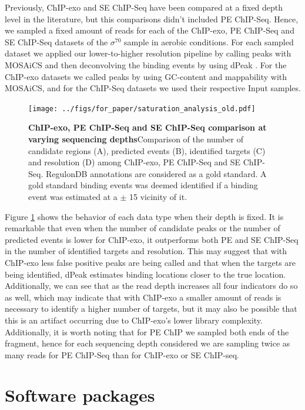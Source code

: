\documentclass[11pt]{article}\usepackage[]{graphicx}\usepackage[]{color}
\begin{document}
Previously, ChIP-exo and SE ChIP-Seq have been compared at a fixed
depth level in the literature, but this comparisons didn't included PE
ChIP-Seq. Hence, we sampled a fixed amount of reads for each of the
ChIP-exo, PE ChIP-Seq and SE ChIP-Seq datasets of the $\sigma^{70}$
sample in aerobic conditions. For each sampled dataset we applied our
lower-to-higher resolution pipeline by calling peaks with MOSAiCS
\cite{mosaics} and then deconvolving the binding events by using dPeak
\cite{dpeak}. For the ChIP-exo datasets we called peaks by using
GC-content and mappability with MOSAiCS, and for the ChIP-Seq datasets
we used their respective Input samples.

\begin{figure}[H]
  \centering
  \texttt{[image: ../figs/for\_paper/saturation\_analysis\_old.pdf]}
  \caption{\textbf{ChIP-exo, PE ChIP-Seq and SE ChIP-Seq comparison at
      varying sequencing depths}Comparison of the number of candidate
    regions (A), predicted events (B), identified targets (C) and
    resolution (D) among ChIP-exo, PE ChIP-Seq and SE
    ChIP-Seq. RegulonDB annotations are considered as a gold
    standard. A gold standard binding events was deemed identified if
    a binding event was estimated at a $\pm$ 15 vicinity of
    it.}
  \label{fig:design}
\end{figure}

Figure \ref{fig:design} shows the behavior of each data type when
their depth is fixed. It is remarkable that even when the number of
candidate peaks or the number of predicted events is lower for
ChIP-exo, it outperforms both PE and SE ChIP-Seq in the number of
identified targets and resolution. This may suggest that with ChIP-exo
less false positive peaks are being called and that when the targets
are being identified, dPeak estimates binding locations closer to the
true location. Additionally, we can see that as the read depth
increases all four indicators do so as well, which may indicate that
with ChIP-exo a smaller amount of reads is necessary to identify a
higher number of targets, but it may also be possible that this is an
artifact occurring due to ChIP-exo's lower library
complexity. Additionally, it is worth noting that for PE ChIP we
sampled both ends of the fragment, hence for each sequencing depth
considered we are sampling twice as many reads for PE ChIP-Seq than
for ChIP-exo or SE ChIP-seq.

\section{Software packages}
\label{sec:software}
\end{document}
